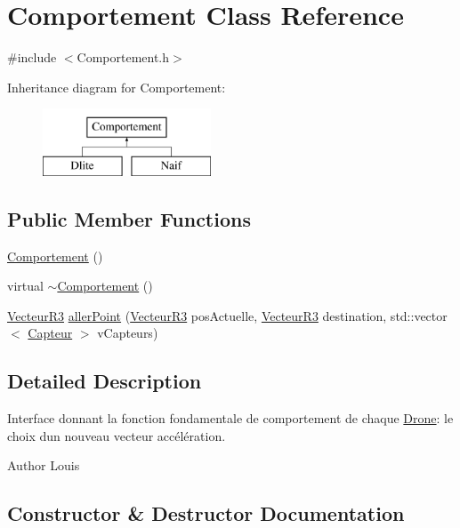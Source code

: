 \hypertarget{class_comportement}{}\section{Comportement Class Reference}
\label{class_comportement}


{\ttfamily \#include $<$Comportement.\+h$>$}

Inheritance diagram for Comportement\+:\begin{figure}[H]
\begin{center}
\leavevmode
\includegraphics[height=2.000000cm]{class_comportement}
\end{center}
\end{figure}
\subsection*{Public Member Functions}
\begin{DoxyCompactItemize}
\item 
\mbox{\hyperlink{class_comportement_a0c75007d7346cc14bb680eaa2981cb51}{Comportement}} ()
\item 
virtual \mbox{\hyperlink{class_comportement_acbe985635ed33cf141f380720c2e3f77}{$\sim$\+Comportement}} ()
\item 
\mbox{\hyperlink{class_vecteur_r3}{Vecteur\+R3}} \mbox{\hyperlink{class_comportement_a4404a711b71657ca68c0b199ecf023b8}{aller\+Point}} (\mbox{\hyperlink{class_vecteur_r3}{Vecteur\+R3}} pos\+Actuelle, \mbox{\hyperlink{class_vecteur_r3}{Vecteur\+R3}} destination, std\+::vector$<$ \mbox{\hyperlink{class_capteur}{Capteur}} $>$ v\+Capteurs)
\end{DoxyCompactItemize}


\subsection{Detailed Description}
Interface donnant la fonction fondamentale de comportement de chaque \mbox{\hyperlink{class_drone}{Drone}}\+: le choix d\textquotesingle{}un nouveau vecteur accélération. \begin{DoxyAuthor}{Author}
Louis 
\end{DoxyAuthor}


\subsection{Constructor \& Destructor Documentation}
\mbox{\label{class_comportement_a0c75007d7346cc14bb680eaa2981cb51}} 
